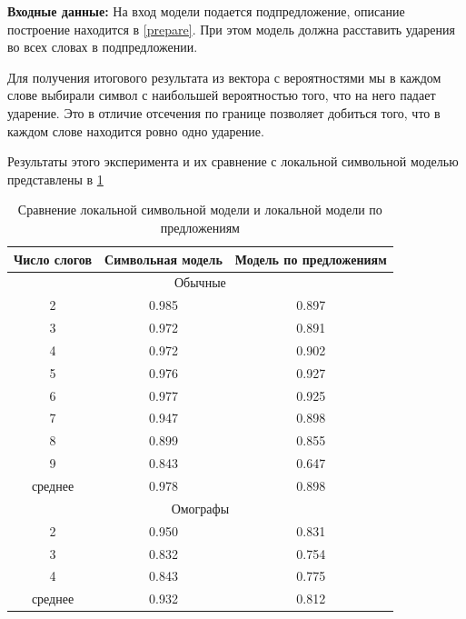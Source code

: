 \documentclass[14pt, a4paper, russian]{report}
\begin{document}
\begin{normalsize}
\textbf{Входные данные:} На вход модели подается подпредложение, описание построение находится в \cref{prepare}. При этом модель должна расставить ударения во всех словах в подпредложении.

Для получения итогового результата из вектора с вероятностями мы в каждом слове выбирали символ с наибольшей вероятностью того, что на него падает ударение. Это в отличие отсечения по границе позволяет добиться того, что в каждом слове находится ровно одно ударение.

Результаты этого эксперимента и их сравнение с локальной символьной моделью представлены в \cref{table:local_sent}

\begin{table}[H]
		\caption{Сравнение локальной символьной модели и локальной модели по предложениям}
	\begin{small}
		\begin{center}
			\begin{tabular}{|c|c|c|}
				\hline
				Число слогов & Символьная модель  & Модель по предложениям\\
				\hline
				\multicolumn{3}{|c|}{Обычные} \\			
				\hline
				2 &  0.985 & 0.897 \\
				\hline
				3 & 0.972& 0.891\\
				\hline
				4 &0.972& 0.902\\
				\hline
				5 &0.976 & 0.927\\
				\hline
				6 &0.977 &  0.925  \\
				\hline
				7 & 0.947 & 0.898\\
				\hline
				8 & 0.899 & 0.855\\
				\hline
				9 & 0.843 &0.647\\
				\hline
				среднее & 0.978 &0.898\\
				\hline				
				\multicolumn{3}{|c|}{Омографы} \\			
				\hline
				2 &0.950 &0.831\\
				\hline
				3 &0.832 &0.754\\
				\hline
				4 & 0.843 &0.775\\
				\hline
				среднее & 0.932 & 0.812\\
				\hline				
				
			\end{tabular}
		\end{center}
	\end{small}

	\label{table:local_sent}
\end{table}


\end{normalsize}
\end{document}
